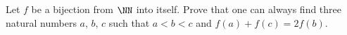 Let $f$ be a bijection from $\NN$ into itself. Prove that one can always find three natural numbers $a$, $b$, $c$ such that $a < b < c$ and $f(a)+ f(c) = 2 f(b)$.
